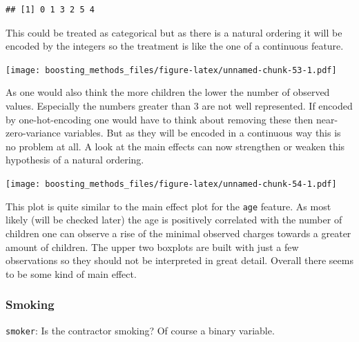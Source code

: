 \documentclass[
]{book}
\newenvironment{Shaded}{\begin{snugshade}}{\end{snugshade}}
\newcommand{\CommentTok}[1]{\textcolor[rgb]{0.56,0.35,0.01}{\textit{#1}}}
\newcommand{\FunctionTok}[1]{\textcolor[rgb]{0.00,0.00,0.00}{#1}}
\newcommand{\NormalTok}[1]{#1}
\newcommand{\SpecialCharTok}[1]{\textcolor[rgb]{0.00,0.00,0.00}{#1}}
\begin{document}
\begin{Shaded}
\end{Shaded}

\begin{verbatim}
## [1] 0 1 3 2 5 4
\end{verbatim}

This could be treated as categorical but as there is a natural ordering it will be encoded by the integers so the treatment is like the one of a continuous feature.

\texttt{[image: boosting\_methods\_files/figure-latex/unnamed-chunk-53-1.pdf]}

As one would also think the more children the lower the number of observed values. Especially the numbers greater than 3 are not well represented. If encoded by one-hot-encoding one would have to think about removing these then near-zero-variance variables. But as they will be encoded in a continuous way this is no problem at all. A look at the main effects can now strengthen or weaken this hypothesis of a natural ordering.

\texttt{[image: boosting\_methods\_files/figure-latex/unnamed-chunk-54-1.pdf]}

This plot is quite similar to the main effect plot for the \texttt{age} feature. As most likely (will be checked later) the age is positively correlated with the number of children one can observe a rise of the minimal observed charges towards a greater amount of children. The upper two boxplots are built with just a few observations so they should not be interpreted in great detail. Overall there seems to be some kind of main effect.

\hypertarget{smoking}{%
\subsubsection{Smoking}\label{smoking}}

\texttt{smoker}: Is the contractor smoking? Of course a binary variable.

\begin{Shaded}
\end{Shaded}
\end{document}
